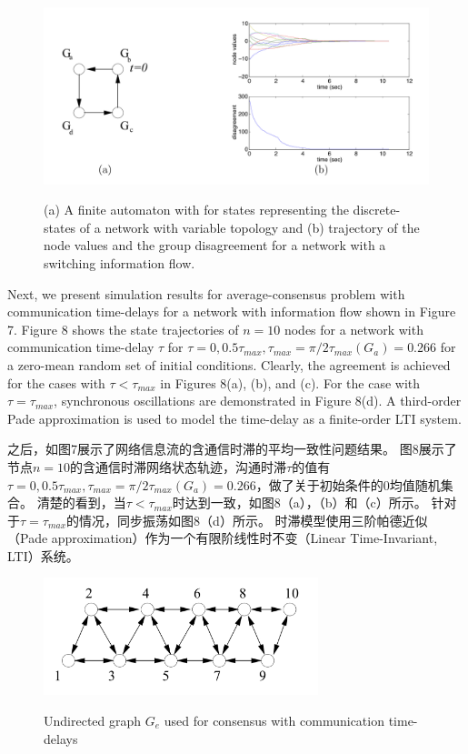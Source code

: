 \documentclass{article}
\begin{document}
\begin{figure}[htbp]
    \centering
    \includegraphics[width=14.5cm]{figures/Fig6-Automaton.jpeg}
    \label{Automaton}
    \caption{(a) A finite automaton with for states representing the discrete-states of a network with variable topology and (b) trajectory of the node values and the group disagreement for a network with a switching information flow.}
\end{figure}

{\color[gray]{0.5}
Next, we present simulation results for average-consensus problem with communication time-delays for a network with information ﬂow shown in Figure 7. 
Figure 8 shows the state trajectories of $n=10$ nodes for a network with communication time-delay $\tau$ for $\tau=0, 0.5\tau_{max}, \tau_{max} = \pi / 2\tau_{max}(G_a) = 0.266$ for a zero-mean random set of initial conditions. 
Clearly, the agreement is achieved for the cases with $\tau < \tau_{max}$ in Figures 8(a), (b), and (c). 
For the case with $\tau = \tau_{max}$, synchronous oscillations are demonstrated in Figure 8(d). 
{\color{green} A third-order Pade approximation is used to model the time-delay as a ﬁnite-order LTI system.}
}

之后，如图7展示了网络信息流的含通信时滞的平均一致性问题结果。
图8展示了节点$n=10$的含通信时滞网络状态轨迹，沟通时滞$\tau$的值有$\tau=0, 0.5\tau_{max}, \tau_{max} = \pi / 2\tau_{max}(G_a) = 0.266$，做了关于初始条件的0均值随机集合。
清楚的看到，当$\tau < \tau_{max}$时达到一致，如图8（a），（b）和（c）所示。
针对于$\tau = \tau_{max}$的情况，同步振荡如图8（d）所示。
时滞模型使用三阶帕德近似（Pade approximation）作为一个有限阶线性时不变（Linear Time-Invariant, LTI）系统。

\begin{figure}[htbp]
    \centering
    \includegraphics[width=8cm]{figures/Fig7-Undirected.jpeg}
    \label{Undirected}
    \caption{Undirected graph $G_e$ used for consensus with communication time-delays}
\end{figure}
\end{document}
